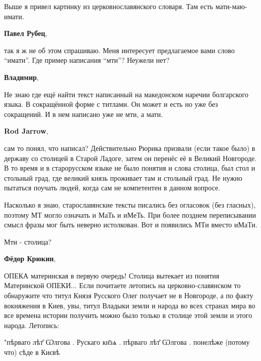 \begin{itemize}
\begin{itemize}
Выше я привел картинку из церковнославянского словаря. Там есть мати-маю-имати.

\textbf{Павел Рубец}, 

так я ж не об этом спрашиваю. Меня интересует предлагаемое вами слово \enquote{имати}.
Где пример написания \enquote{мти}? Неужели нет?

\textbf{Владимир}, 

Не знаю где ещё найти текст написанный на македонском наречии болгарского
языка. В сокращённой форме с титлами. Он может и есть но уже без сокращений. И в
нем написано уже не мти, а мати.

\textbf{Rod Jarrow}, 

сам то понял, что написал? Действительно Рюрика призвали (если такое было) в
державу со столицей в Старой Ладоге, затем он перенёс её в Великий Новгороде. В
то время и в старорусском языке не было понятия и слова столица, был стол и
стольный град, где великий князь проживает там и стольный град. Не нужно
пытаться поучать людей, когда сам не компетентен в данном вопросе.

\end{itemize} %


Насколько я знаю, старославянские тексты писались без огласовок (без гласных),
поэтому МТ могло означать и МаТь и иМеТь. При более позднем переписывании смысл
фразы мог быть неверно истолкован. Вот и появились МТи вместо иМаТи.


Мти - столица?

\begin{itemize} %
\textbf{Фёдор Крюкин}, 

ОПЕКА материнская в первую очередь! Столица вытекает из понятия Материнской
ОПЕКИ... Если почитаете летопись на церковно-славянском то обнаружите что титул
Князя Русского Олег получает не в Новгороде, а по факту вокняжения в Киев, увы,
титул Владыки земли и народа во всех странах мира во все времена истории
получить можно было только в столице этой земли и этого народа. Летопись:

"пѣрваго лѣт̑ Ѡлгова . Рускаго кн҃зѧ . пѣрваго лѣт̑ Ѡлгова . понелѣже (потому что)
сѣде в Києвѣ

\end{itemize} %



\end{itemize}
